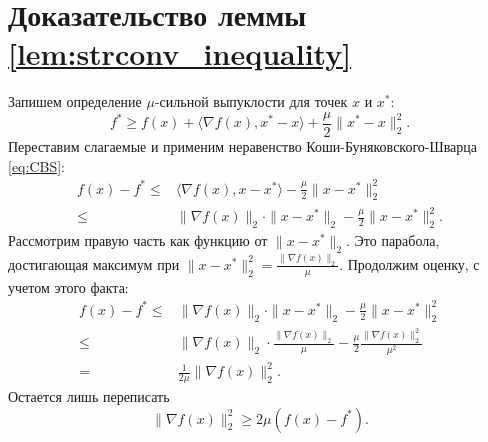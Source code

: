 \section{Доказательство леммы \ref{lem:strconv_inequality}} \label{app:strconv_inequality_proof}
    Запишем определение $\mu$-сильной выпуклости для точек $x$ и $x^*$:
    \begin{equation*}
        f^* \geq f(x) + \langle \nabla f(x), x^* - x \rangle + \frac{\mu}{2} \|x^* - x\|_2^2.
    \end{equation*}
    Переставим слагаемые и применим неравенство Коши-Буняковского-Шварца \eqref{eq:CBS}:
    \begin{align*}
        f(x) - f^* \leq& \langle \nabla f(x), x - x^* \rangle - \frac{\mu}{2} \|x - x^*\|_2^2 \\
        \leq& \|\nabla f(x)\|_2 \cdot \|x - x^*\|_2 - \frac{\mu}{2} \|x - x^*\|_2^2.
    \end{align*}
    Рассмотрим правую часть как функцию от $\|x - x^*\|_2$. Это парабола, достигающая максимум при $\|x - x^*\|_2^2 = \frac{\|\nabla f(x)\|_2}{\mu}$. Продолжим оценку, с учетом этого факта:
    \begin{align*}
        f(x) - f^* \leq& \|\nabla f(x)\|_2 \cdot \|x - x^*\|_2 - \frac{\mu}{2} \|x - x^*\|_2^2\\
        \leq& \|\nabla f(x)\|_2 \cdot \frac{\|\nabla f(x)\|_2}{\mu} - \frac{\mu}{2} \frac{\|\nabla f(x)\|_2^2}{\mu^2}\\
        =& \frac{1}{2\mu} \|\nabla f(x)\|_2^2.
    \end{align*}
    Остается лишь переписать
    \begin{equation*}
        \|\nabla f(x)\|_2^2 \geq 2\mu (f(x) - f^*).
    \end{equation*}
